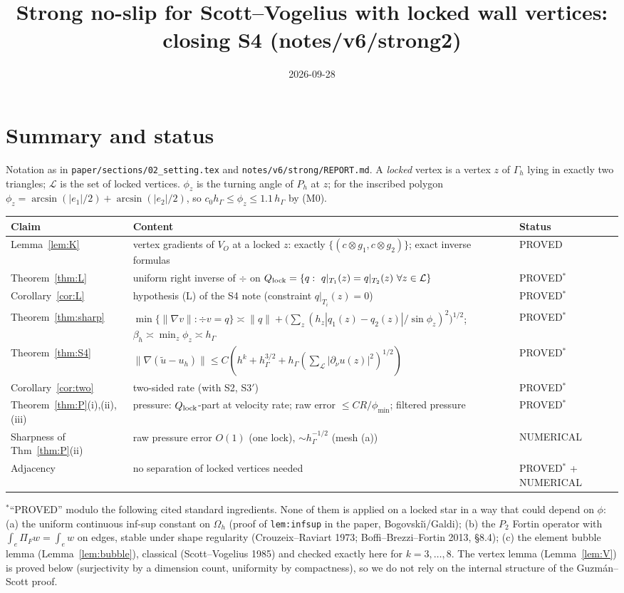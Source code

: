 \documentclass[11pt]{article}
\title{Strong no-slip for Scott--Vogelius with locked wall vertices:\\ closing S4 (notes/v6/strong2)}
\date{2026-09-28}
\theoremstyle{remark}
\newcommand{\hG}{h_\Gamma}
\newcommand{\VO}{V_O}
\newcommand{\Lk}{\mathcal L}
\newcommand{\dn}{\partial_\nu}
\newcommand{\norm}[1]{\|#1\|}
\newcommand{\Ql}{Q_{\rm lock}}
\begin{document}
\maketitle

\section*{Summary and status}
Notation as in \texttt{paper/sections/02\_setting.tex} and \texttt{notes/v6/strong/REPORT.md}.
A \emph{locked} vertex is a vertex $z$ of $\Gamma_h$ lying in exactly two triangles; $\Lk$ is the set of
locked vertices. $\phi_z$ is the turning angle of $P_h$ at $z$; for the inscribed polygon
$\phi_z=\arcsin(|e_1|/2)+\arcsin(|e_2|/2)$, so $c_0\hG\le\phi_z\le 1.1\,\hG$ by (M0).

\begin{center}\small\begin{tabular}{p{3.2cm}p{9.6cm}p{2.4cm}}
\toprule
Claim & Content & Status\\\midrule
Lemma~\ref{lem:K} & vertex gradients of $\VO$ at a locked $z$: exactly $\{(c\otimes g_1,c\otimes g_2)\}$; exact inverse formulas & PROVED\\
Theorem~\ref{thm:L} & uniform right inverse of $\div$ on $\Ql=\{q:\ q|_{T_1}(z)=q|_{T_2}(z)\ \forall z\in\Lk\}$ & PROVED$^*$\\
Corollary~\ref{cor:L} & hypothesis (L) of the S4 note (constraint $q|_{T_i}(z)=0$) & PROVED$^*$\\
Theorem~\ref{thm:sharp} & $\min\{\norm{\nabla v}:\div v=q\}\asymp\norm q+\big(\sum_z(h_z|q_1(z)-q_2(z)|/\sin\phi_z)^2\big)^{1/2}$; $\beta_h\asymp\min_z\phi_z\asymp\hG$ & PROVED$^*$\\
Theorem~\ref{thm:S4} & $\norm{\nabla(\tilde u-u_h)}\le C(h^k+\hG^{3/2}+\hG(\sum_{\Lk}|\dn u(z)|^2)^{1/2})$ & PROVED$^*$\\
Corollary~\ref{cor:two} & two-sided rate (with S2, S3$'$) & PROVED$^*$\\
Theorem~\ref{thm:P}(i),(ii),(iii) & pressure: $\Ql$-part at velocity rate; raw error $\le CR/\phi_{\min}$; filtered pressure & PROVED$^*$\\
Sharpness of Thm~\ref{thm:P}(ii) & raw pressure error $O(1)$ (one lock), $\sim\hG^{-1/2}$ (mesh (a)) & NUMERICAL\\
Adjacency & no separation of locked vertices needed & PROVED$^*$ + NUMERICAL\\
\bottomrule\end{tabular}\end{center}
$^*$``PROVED'' modulo the following cited standard ingredients. None of them is applied on a locked star in a
way that could depend on $\phi$:
(a) the uniform continuous inf-sup constant on $\Omega_h$ (proof of \texttt{lem:infsup} in the paper, Bogovski\u{\i}/Galdi);
(b) the $P_2$ Fortin operator with $\int_e\Pi_F w=\int_e w$ on edges, stable under shape regularity
(Crouzeix--Raviart 1973; Boffi--Brezzi--Fortin 2013, \S8.4);
(c) the element bubble lemma (Lemma~\ref{lem:bubble}), classical (Scott--Vogelius 1985) and checked exactly here for $k=3,\dots,8$.
The vertex lemma (Lemma~\ref{lem:V}) is proved below (surjectivity by a dimension count, uniformity by compactness),
so we do not rely on the internal structure of the Guzm\'an--Scott proof.
\end{document}
